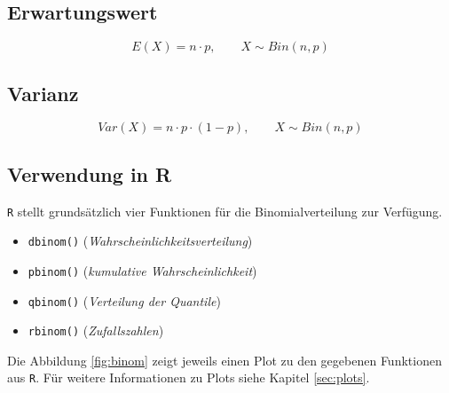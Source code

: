\subsection{Erwartungswert}

\[  
	E(X) = n \cdot p, \qquad X \sim Bin(n,p)
\]


\subsection{Varianz}

\[  
	Var(X) = n \cdot p \cdot (1-p), \qquad X \sim Bin(n,p)
\]

\subsection{Verwendung in R}
\lstinline{R} stellt grundsätzlich vier Funktionen für die 
Binomialverteilung zur Verfügung. 
\begin{itemize}
	\item \lstinline{dbinom()} \hfill{} 
		(\emph{Wahrscheinlichkeitsverteilung})
	\item \lstinline{pbinom()} \hfill{}
		(\emph{kumulative Wahrscheinlichkeit})
	\item \lstinline{qbinom()} \hfill{}
		(\emph{Verteilung der Quantile})
	\item \lstinline{rbinom()} \hfill{}
		(\emph{Zufallszahlen})
\end{itemize}
Die Abbildung \ref{fig:binom} zeigt jeweils einen Plot zu den gegebenen
Funktionen aus \lstinline{R}. Für weitere Informationen zu Plots siehe
Kapitel \ref{sec:plots}.





